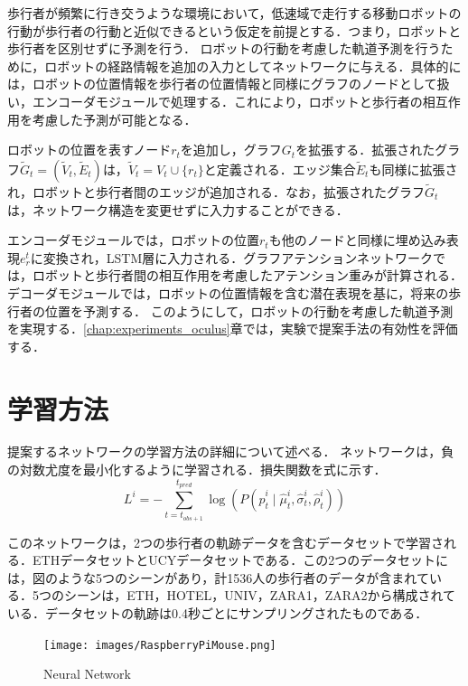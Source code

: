 歩行者が頻繁に行き交うような環境において，低速域で走行する移動ロボットの行動が歩行者の行動と近似できるという仮定を前提とする．つまり，ロボットと歩行者を区別せずに予測を行う．
ロボットの行動を考慮した軌道予測を行うために，ロボットの経路情報を追加の入力としてネットワークに与える．具体的には，ロボットの位置情報を歩行者の位置情報と同様にグラフのノードとして扱い，エンコーダモジュールで処理する．これにより，ロボットと歩行者の相互作用を考慮した予測が可能となる．

ロボットの位置を表すノード$r_t$を追加し，グラフ$G_t$を拡張する．拡張されたグラフ$\tilde{G}_t = (\tilde{V}_t, \tilde{E}_t)$は，$\tilde{V}_t = V_t \cup \{ r_t \}$と定義される．エッジ集合$\tilde{E}_t$も同様に拡張され，ロボットと歩行者間のエッジが追加される．なお，拡張されたグラフ$\tilde{G}_t$は，ネットワーク構造を変更せずに入力することができる．

エンコーダモジュールでは，ロボットの位置$r_t$も他のノードと同様に埋め込み表現$e^t_r$に変換され，LSTM層に入力される．グラフアテンションネットワークでは，ロボットと歩行者間の相互作用を考慮したアテンション重みが計算される．デコーダモジュールでは，ロボットの位置情報を含む潜在表現を基に，将来の歩行者の位置を予測する．
このようにして，ロボットの行動を考慮した軌道予測を実現する．\ref{chap:experiments_oculus}章では，実験で提案手法の有効性を評価する．

\section{学習方法}\label{sec:learning-method}
提案するネットワークの学習方法の詳細について述べる．
ネットワークは，負の対数尤度を最小化するように学習される．損失関数を式に示す．
\begin{equation}
  L^i = -\sum_{t=t_{obs+1}}^{t_{pred}} \log \left( P(\hat{p}^i_t \mid \hat{\mu}^i_t, \hat{\sigma}^i_t, \hat{\rho}^i_t) \right)
\end{equation}

このネットワークは，2つの歩行者の軌跡データを含むデータセットで学習される．ETHデータセット\cite{pellegrini2009you-eth}とUCYデータセット\cite{lerner2007crowds-ucy}である．この2つのデータセットには，図のような5つのシーンがあり，計1536人の歩行者のデータが含まれている．5つのシーンは，ETH，HOTEL，UNIV，ZARA1，ZARA2から構成されている．データセットの軌跡は0.4秒ごとにサンプリングされたものである．

\begin{figure}[hbtp]
  \centering
 \texttt{[image: images/RaspberryPiMouse.png]}
 \caption{Neural Network}
 \label{Fig:hoge4}
\end{figure}

